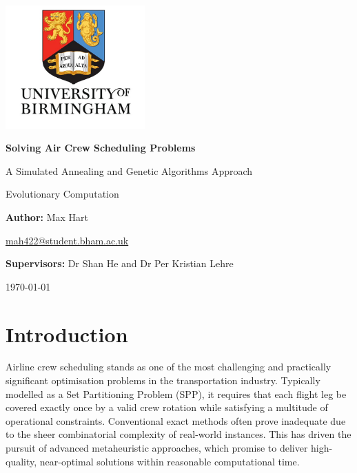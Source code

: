 \documentclass[12pt]{article}
\begin{document}
\begin{titlepage}
    \centering
    \vspace*{1cm}
    
    \includegraphics[width=0.4\textwidth]{UoB.jpg}\par\vspace{1cm}
    
    {\LARGE\bfseries Solving Air Crew Scheduling Problems\par}
    \vspace{0.5cm}
    {\Large A Simulated Annealing and Genetic Algorithms Approach\par}
    \vspace{0.75cm}
    
    {\large Evolutionary Computation\par}
    \vspace{1.5cm}
    
    {\large\textbf{Author:} Max Hart\par}
    \vspace{0.3cm}
    {\normalsize \href{mailto:mah422@student.bham.ac.uk}{mah422@student.bham.ac.uk}\par}
    \vspace{1.5cm}
    
    {\large\textbf{Supervisors:} Dr Shan He and Dr Per Kristian Lehre\par}
    \vspace{1cm}
    
    {\large \today\par}
    
\end{titlepage}

\tableofcontents
\newpage

\section{Introduction}
Airline crew scheduling stands as one of the most challenging and practically significant optimisation problems in the transportation industry. Typically modelled as a Set Partitioning Problem (SPP), it requires that each flight leg be covered exactly once by a valid crew rotation while satisfying a multitude of operational constraints. Conventional exact methods often prove inadequate due to the sheer combinatorial complexity of real-world instances. This has driven the pursuit of advanced metaheuristic approaches, which promise to deliver high-quality, near-optimal solutions within reasonable computational time.
\end{document}
